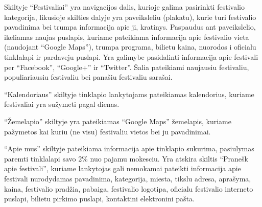 ﻿\documentclass{VUMIFPSkursinis}
\begin{document}
{Skiltyje “Festivaliai” yra navigacijos dalis, kurioje galima pasirinkti festivalio kategorija, likusioje skilties dalyje yra paveiksleliu (plakatu), kurie turi festivalio pavadinima bei trumpa informacija apie ji, kratinys. Paspaudus ant paveikslelio, ikeliamas naujas puslapis, kuriame pateikiama informacija apie festivalio vieta (naudojant “Google Maps”), trumpa programa, bilietu kaina, nuorodos i oficialu tinklalapi ir pardaveju puslapi. Yra galimybe pasidalinti informacija apie festivali per “Facebook”, “Google+” ir “Twitter”. Šalia pateikiami naujausiu festivaliu, populiariausiu festivaliu bei panašiu festivaliu sarašai. 

“Kalendoriaus” skiltyje tinklapio lankytojams pateikiamas kalendorius, kuriame festivaliai yra sužymeti pagal dienas.

“Žemelapio”  skiltyje yra pateikiamas “Google Maps” žemelapis, kuriame pažymetos kai kuriu (ne visu) festivaliu vietos bei ju pavadinimai.
 
“Apie mus” skiltyje pateikiama informacija apie tinklapio sukurima, pasiulymas paremti tinklalapi savo 2\% nuo pajamu mokesciu.
Yra atskira skiltis “Pranešk apie festivali”, kuriame lankytojas gali nemokamai pateikti informacija apie festivali nurodydamas pavadinima, kategorija, miesta, tikslu adresa, aprašyma, kaina, festivalio pradžia, pabaiga, festivalio logotipa, oficialu festivalio interneto puslapi, bilietu pirkimo puslapi, kontaktini elektronini pašta. 



}
\end{document}
